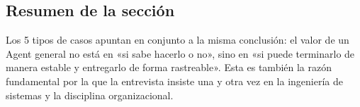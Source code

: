 \subsection{Resumen de la sección}

Los 5 tipos de casos apuntan en conjunto a la misma conclusión: el valor de un Agent general no está en «si sabe hacerlo o no», sino en «si puede terminarlo de manera estable y entregarlo de forma rastreable». Esta es también la razón fundamental por la que la entrevista insiste una y otra vez en la ingeniería de sistemas y la disciplina organizacional.

